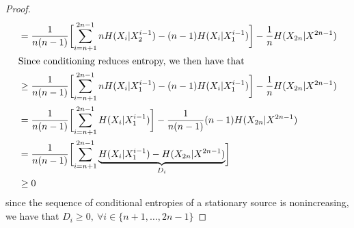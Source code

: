\documentclass[
  coursecode={MTHE 474},
  assignmentname={Homework \homeworknumber},
  studentnumber=20053722,
  name={Bryan Hoang},
  draft,
]{
  ltxanswer%
}
\begin{document}
\begin{questions}
\begin{parts}
\begin{subparts}
\begin{solution}
\begin{proof}
\begin{align*}
               &= \frac{1}{n(n-1)} \biggl[\sum_{i=n+1}^{2n-1} nH(X_{i}|X_{2}^{i-1}) - (n-1)H(X_{i}|X_{1}^{i-1}) \biggr] - \frac{1}{n} H(X_{2n}|X^{2n-1})                                                            \\
              \intertext{Since conditioning reduces entropy, we then have that}
               &\ge \frac{1}{n(n-1)} \biggl[\sum_{i=n+1}^{2n-1} nH(X_{i}|X_{1}^{i-1}) - (n-1)H(X_{i}|X_{1}^{i-1}) \biggr] - \frac{1}{n} H(X_{2n}|X^{2n-1})                                                          \\
               &= \frac{1}{n(n-1)} \biggl[\sum_{i=n+1}^{2n-1} H(X_{i}|X_{1}^{i-1})\biggr] - \frac{1}{n(n-1)}(n-1) H(X_{2n}|X^{2n-1})                                                                                \\
               &= \frac{1}{n(n-1)} \biggl[\sum_{i=n+1}^{2n-1} \underbrace{H(X_{i}|X_{1}^{i-1}) - H(X_{2n}|X^{2n-1})}_{D_{i}}\biggr]                                                                                 \\
               &\ge 0
            \end{align*}
            since the sequence of conditional entropies of a stationary source is nonincreasing, we have that \(D_{i} \ge 0,\ \forall i \in \{n+1, \dotsc, 2n-1\}\)
          \end{proof}
        \end{solution}


\end{subparts}
\end{parts}
\end{questions}
\end{document}
